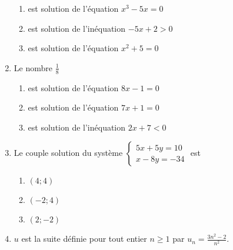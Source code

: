 \documentclass[oneside,twocolumn,landscape]{book}
\begin{document}
\begin{enumerate}
\begin{enumerate}



\item\BonneReponse est solution de l'équation $x^{3}-5x=0$


\item\MauvaiseReponse est solution de l'inéquation $-5x+2>0$

\item\MauvaiseReponse est solution de l'équation $x^{2}+5=0$


\end{enumerate}

\newpage


\item Le nombre $\frac{1}{8}$

\begin{enumerate}



\item\BonneReponse est solution de l'équation $8x-1=0$

\item\MauvaiseReponse est solution de l'équation $7x+1=0$


\item\MauvaiseReponse est solution de l'inéquation $2x+7<0$


\end{enumerate}




\item Le couple solution du système $\left\{\begin{array}{c}5x+5y=10 \\ x-8y=-34
\end{array}\right.$ est

\begin{enumerate}


\item\MauvaiseReponse $(4;4)$


\item\BonneReponse $(-2 ;4)$

\item\MauvaiseReponse $(2 ; -2)$



\end{enumerate}







\item $u$ est la suite définie pour tout entier $n \geqslant 1$ par $u_{n}=\frac{3n^{2}-2}{n^{2}}$.


\end{enumerate}
\end{document}
